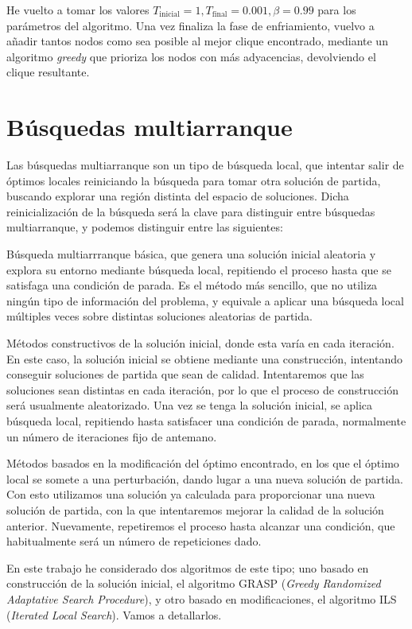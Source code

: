 He vuelto a tomar los valores $T_{\text{inicial}} = 1, T_{\text{final}} = 0.001,
\beta = 0.99$ para los parámetros del algoritmo. Una vez finaliza la fase de enfriamiento,
vuelvo a añadir tantos nodos como sea posible al mejor clique encontrado, mediante un algoritmo
\textit{greedy} que prioriza los nodos con más adyacencias, devolviendo el clique resultante.



\section{Búsquedas multiarranque}

Las búsquedas multiarranque son un tipo de búsqueda local, que intentar salir de óptimos
locales reiniciando la búsqueda para tomar otra solución de partida, buscando explorar
una región distinta del espacio de soluciones. Dicha reinicialización de la búsqueda será
la clave para distinguir entre búsquedas multiarranque, y podemos distinguir entre las siguientes:

Búsqueda multiarrranque básica, que genera una solución inicial aleatoria y explora su entorno
mediante búsqueda local, repitiendo el proceso hasta que se satisfaga una condición de parada.
Es el método más sencillo, que no utiliza ningún tipo de información del problema, y equivale
a aplicar una búsqueda local múltiples veces sobre distintas soluciones aleatorias de partida.

Métodos constructivos de la solución inicial, donde esta varía en cada iteración. En este caso,
la solución inicial se obtiene mediante una construcción, intentando conseguir soluciones de
partida que sean de calidad. Intentaremos que las soluciones sean distintas en cada iteración,
por lo que el proceso de construcción será usualmente aleatorizado. Una vez se tenga la solución
inicial, se aplica búsqueda local, repitiendo hasta satisfacer una condición de parada,
normalmente un número de iteraciones fijo de antemano.

Métodos basados en la modificación del óptimo encontrado, en los que el óptimo local se somete
a una perturbación, dando lugar a una nueva solución de partida. Con esto utilizamos una
solución ya calculada para proporcionar una nueva solución de partida, con la que intentaremos
mejorar la calidad de la solución anterior. Nuevamente, repetiremos el proceso hasta alcanzar
una condición, que habitualmente será un número de repeticiones dado.

En este trabajo he considerado dos algoritmos de este tipo; uno basado en construcción de
la solución inicial, el algoritmo GRASP (\textit{Greedy Randomized Adaptative Search Procedure}),
y otro basado en modificaciones, el algoritmo ILS (\textit{Iterated Local Search}).
Vamos a detallarlos.

